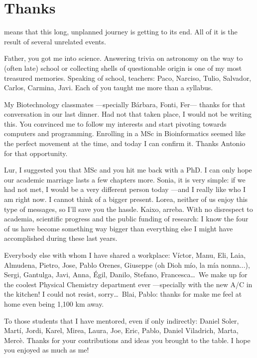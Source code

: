 
\chapter*{Thanks}

 means that this long, unplanned journey is getting to its end. All of it is the result of several unrelated events.

Father, you got me into science. Answering trivia on astronomy on the way to (often late) school or collecting shells of questionable origin is one of my most treasured memories. Speaking of school, teachers: Paco, Narciso, Tulio, Salvador, Carlos, Carmina, Javi. Each of you taught me more than a syllabus.

My Biotechnology classmates ---specially Bárbara, Fonti, Fer--- thanks for that conversation in our last dinner. Had not that taken place, I would not be writing this. You convinced me to follow my interests and start pivoting towards computers and programming. Enrolling in a MSc in Bioinformatics seemed like the perfect movement at the time, and today I can confirm it. Thanks Antonio for that opportunity.

Lur, I suggested you that MSc and you hit me back with a PhD. I can only hope our academic marriage lasts a few chapters more. Sonia, it is very simple: if we had not met, I would be a very different person today ---and I really like who I am right now. I cannot think of a bigger present. Lorea, neither of us enjoy this type of messages, so I'll save you the hassle. Kaixo, arreba. With no disrespect to academia, scientific progress and the public funding of research: I know the four of us have become something way bigger than everything else I might have accomplished during these last years.

Everybody else with whom I have shared a workplace: Víctor, Manu, Eli, Laia, Almudena, Pietro, Jose, Pablo Orenes, Giuseppe (oh Dioh mío, la mía nonna...), Sergi, Gantulga, Javi, Anna, Égil, Danilo, Stefano, Francesca\ldots\ We make up for the coolest Physical Chemistry department ever ---specially with the new A/C in the kitchen! I could not resist, sorry\ldots\ Blai, Pablo: thanks for make me feel at home even being 1,100 km away.  

To those students that I have mentored, even if only indirectly: Daniel Soler, Martí, Jordi, Karel, Mirea, Laura, Joe, Eric, Pablo, Daniel Viladrich, Marta, Mercè. Thanks for your contributions and ideas you brought to the table. I hope you enjoyed as much as me! 

